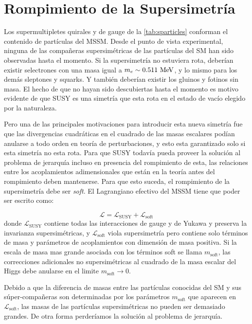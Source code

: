\section{Rompimiento de la Supersimetría}

Los supermultipletes quirales y de gauge de la \cref{tab:sparticles}
conforman el contenido de partículas del MSSM. Desde el punto de vista
experimental, ninguna de las compa\~neras supersimétricas de las
partículas del SM han sido observadas hasta el momento. Si la
supersimetría no estuviera rota, deberían existir selectrones con una
masa igual a $m_e \sim 0.511 \mev$, y lo mismo para los demás
sleptones y squarks. Y también deberían existir los gluinos y fotinos
sin masa. El hecho de que no hayan sido descubiertas hasta el momento
es motivo evidente de que SUSY es una simetría que esta rota en el
estado de vacío elegido por la naturaleza.

Pero una de las principales motivaciones para introducir esta nueva
simetría fue que las divergencias cuadráticas en el cuadrado de las
masas escalares podían anularse a todo orden en teoría de
perturbaciones, y esto esta garantizado solo si esta simetría no esta
rota. Para que SUSY todavía pueda proveer la solución al problema de
jerarquía incluso en presencia del rompimiento de esta, las relaciones
entre los acoplamientos adimensionales que están en la teoría antes
del rompimiento deben mantenerse. Para que esto suceda, el rompimiento
de la supersimetría debe ser \emph{soft}. El Lagrangiano efectivo del
MSSM tiene que poder ser escrito como:

\begin{equation}
  \mathcal{L} = \mathcal{L}_\text{SUSY} + \mathcal{L}_\text{soft}
\end{equation}
%
donde $\mathcal{L}_\text{SUSY}$ contiene todas las interacciones de
gauge y de Yukawa y preserva la invarianza supersimétricas, y
$\mathcal{L}_\text{soft}$ viola supersimetría pero contiene solo
términos de masa y parámetros de acoplamientos con dimensión de masa
positiva. Si la escala de masa mas grande asociada con los términos
soft se llama $m_\text{soft}$, las correcciones adicionales no
supersimétricas al cuadrado de la masa escalar del Higgs debe anularse
en el limite $m_\text{soft} \to 0$.

Debido a que la diferencia de masas entre las partículas conocidas del
SM y sus súper-compañeras son determinadas por los parámetros
$m_\text{soft}$ que aparecen en $\mathcal{L}_\text{soft}$, las masas
de las partículas supersimétricas no pueden ser demasiado grandes. De
otra forma perderíamos la solución al problema de jerarquía.

